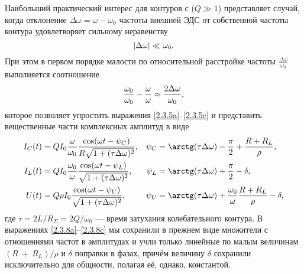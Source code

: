 Наибольший практический интерес для контуров с 
($Q\gg1$) представляет случай, когда отклонение $\Delta\omega=\omega-\omega_0$ частоты
внешней ЭДС от собственной частоты контура удовлетворяет сильному неравенству
\begin{equation}\eqmark{2.3.6}
|\Delta\omega|\ll \omega_0.
\end{equation}
При этом в первом порядке малости по относительной расстройке частоты 
$\frac{\Delta\omega}{\omega_0}$ выполняется соотношение
\begin{equation}\eqmark{2.3.7}
\frac{\omega_0}{\omega_0}-\frac{\omega}{\omega}\approx\frac{2\Delta\omega}{\omega_0},
\end{equation}
которое позволяет упростить выражения \eqref{2.3.5a}--\eqref{2.3.5c} 
и представить вещественные части комплексных амплитуд в виде
\begin{align}
			\eqmark{2.3.8a}
			I_C(t) &= QI_0\dfrac{\omega}{\omega_0}
                \dfrac{\cos(\omega t-\psi_C)}{R\sqrt{1+(\tau\Delta\omega)^2}}, &
            \psi_C &=
                \arctg(\tau\Delta\omega)-\dfrac{\pi}{2}+\dfrac{R+R_L}{\rho}, \\
			\eqmark{2.3.8b}
			I_L(t) &= QI_0\dfrac{\omega_0}{\omega} 
                \dfrac{\cos(\omega t-\psi_L)}{\sqrt{1+(\tau\Delta\omega)^2}}, &
            \psi_L &= \arctg(\tau\Delta\omega)+\dfrac{\pi}{2}-\delta, \\
			\eqmark{2.3.8c}
			U(t) &= Q\rho I_0 \dfrac{\cos(\omega t-\psi_U)}{%
                \sqrt{1+(\tau\Delta\omega)^2}}, &
            \psi_U &=\arctg(\tau\Delta\omega)+
                \dfrac{\omega_0}{\omega}\dfrac{R+R_L}{\rho}-\delta,
\end{align}
%
где $\tau=2L/R_{\Sigma}=2Q/\omega_0$ --- время затухания
колебательного контура. В выражениях \eqref{2.3.8a}--\eqref{2.3.8c} 
мы сохранили в прежнем виде множители с отношениями частот в амплитудах и учли только линейные по малым
величинам $(R~+~R_L)/\rho$ и $\delta$ поправки в фазах, причём величину $\delta$
сохранили исключительно для общности, полагая её, однако, константой.

